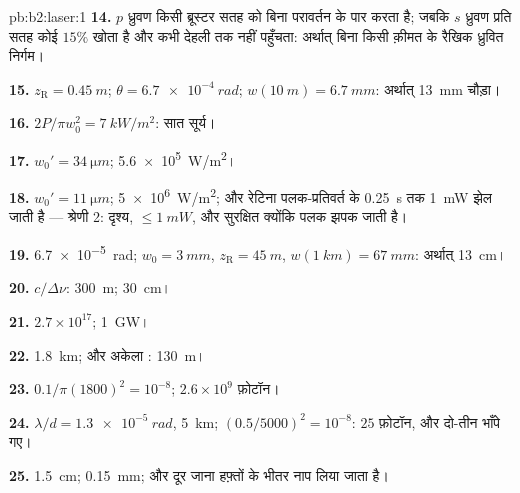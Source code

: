 \begin{solution}{pb:b2:laser:1}
\textbf{14.} $p$ ध्रुवण किसी ब्रूस्टर सतह को बिना परावर्तन के पार
करता है; जबकि $s$ ध्रुवण प्रति सतह कोई $15\%$ खोता है और
कभी देहली तक नहीं पहुँचता: अर्थात् बिना किसी क़ीमत के रैखिक ध्रुवित निर्गम।

\textbf{15.} $z_{\text{R}} = \qty{0.45}{m}$; $\theta = \qty{6.7e-4}{rad}$; $w(\qty{10}{m})
= \qty{6.7}{mm}$: अर्थात् \qty{13}{mm} चौड़ा।

\textbf{16.} $2P/\pi w_0^2 = \qty{7}{kW/m^2}$: सात सूर्य।

\textbf{17.} $w_0' = \qty{34}{\micro m}$; \qty{5.6e5}{W/m^2}।

\textbf{18.} $w_0' = \qty{11}{\micro m}$; \qty{5e6}{W/m^2}; और रेटिना
पलक-प्रतिवर्त के \qty{0.25}{s} तक \qty{1}{mW} झेल जाती है --- श्रेणी 2: दृश्य,
$\le \qty{1}{mW}$, और सुरक्षित क्योंकि पलक झपक जाती है।

\textbf{19.} \qty{6.7e-5}{rad}; $w_0 = \qty{3}{mm}$, $z_{\text{R}} = \qty{45}{m}$,
$w(\qty{1}{km}) = \qty{67}{mm}$: अर्थात् \qty{13}{cm}।

\textbf{20.} $c/\Delta\nu$: \qty{300}{m}; \qty{30}{cm}।

\textbf{21.} $2.7 \times 10^{17}$; \qty{1}{GW}।

\textbf{22.} \qty{1.8}{km}; और अकेला : \qty{130}{m}।

\textbf{23.} $0.1/\pi(1800)^2 = 10^{-8}$; $2.6 \times 10^9$ फ़ोटॉन।

\textbf{24.} $\lambda/d = \qty{1.3e-5}{rad}$, \qty{5}{km}; $(0.5/5000)^2 = 10^{-8}$:
$25$ फ़ोटॉन, और दो-तीन भाँपे गए।

\textbf{25.} \qty{1.5}{cm}; \qty{0.15}{mm}; और दूर जाना हफ़्तों के भीतर
नाप लिया जाता है।
\end{solution}
